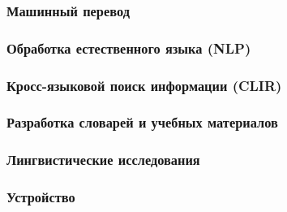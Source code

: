 \subsubsection*{Машинный перевод}

\blindtext

\subsubsection*{Обработка естественного языка (NLP)}

\blindtext

\subsubsection*{Кросс-языковой поиск информации (CLIR)}

\blindtext

\subsubsection*{Разработка словарей и учебных материалов}

\blindtext

\subsubsection*{Лингвистические исследования}

\blindtext


\subsubsection{Устройство}

